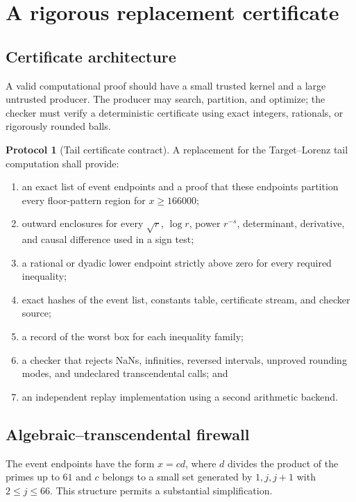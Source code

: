 \documentclass[11pt]{article}
\theoremstyle{definition}
\newtheorem{protocol}[theorem]{Protocol}
\theoremstyle{remark}
\newcommand{\1}{\mathbf 1}
\begin{document}
\section{A rigorous replacement certificate}\label{sec:certificate}

\subsection{Certificate architecture}

A valid computational proof should have a small trusted kernel and a large untrusted producer.  The producer may search, partition, and optimize; the checker must verify a deterministic certificate using exact integers, rationals, or rigorously rounded balls.

\begin{protocol}[Tail certificate contract]\label{prot:tail}
A replacement for the Target--Lorenz tail computation shall provide:
\begin{enumerate}
\item an exact list of event endpoints and a proof that these endpoints partition every floor-pattern region for \(x\ge166000\);
\item outward enclosures for every \(\sqrt{r}\), \(\log r\), power \(r^{-s}\), determinant, derivative, and causal difference used in a sign test;
\item a rational or dyadic lower endpoint strictly above zero for every required inequality;
\item exact hashes of the event list, constants table, certificate stream, and checker source;
\item a record of the worst box for each inequality family;
\item a checker that rejects NaNs, infinities, reversed intervals, unproved rounding modes, and undeclared transcendental calls; and
\item an independent replay implementation using a second arithmetic backend.
\end{enumerate}
\end{protocol}

\subsection{Algebraic--transcendental firewall}

The event endpoints have the form \(x=cd\), where \(d\) divides the product of the primes up to \(61\) and \(c\) belongs to a small set generated by \(1,j,j+1\) with \(2\le j\le66\).  This structure permits a substantial simplification.
\end{document}
